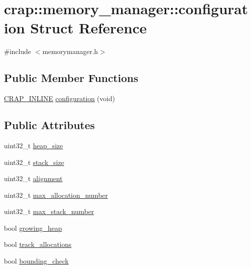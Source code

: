 \hypertarget{structcrap_1_1memory__manager_1_1configuration}{\section{crap\+:\+:memory\+\_\+manager\+:\+:configuration Struct Reference}
\label{structcrap_1_1memory__manager_1_1configuration}
}


{\ttfamily \#include $<$memorymanager.\+h$>$}

\subsection*{Public Member Functions}
\begin{DoxyCompactItemize}
\item 
\hyperlink{config__x86_8h_a5a40526b8d842e7ff731509998bb0f1c}{C\+R\+A\+P\+\_\+\+I\+N\+L\+I\+N\+E} \hyperlink{structcrap_1_1memory__manager_1_1configuration_a2fcb5bff5a3fbed1dc8a653fbbf1e035}{configuration} (void)
\end{DoxyCompactItemize}
\subsection*{Public Attributes}
\begin{DoxyCompactItemize}
\item 
uint32\+\_\+t \hyperlink{structcrap_1_1memory__manager_1_1configuration_aa7b7dd302d12394b4933cd10c19b9bb3}{heap\+\_\+size}
\item 
uint32\+\_\+t \hyperlink{structcrap_1_1memory__manager_1_1configuration_ab2398e2eef2484e19c711e4a5afade26}{stack\+\_\+size}
\item 
uint32\+\_\+t \hyperlink{structcrap_1_1memory__manager_1_1configuration_a4e2eb1caa57526730fc6aed395b9d13d}{alignment}
\item 
uint32\+\_\+t \hyperlink{structcrap_1_1memory__manager_1_1configuration_a793bafe39295d86d3dda7b2406678ee2}{max\+\_\+allocation\+\_\+number}
\item 
uint32\+\_\+t \hyperlink{structcrap_1_1memory__manager_1_1configuration_ae29f9aa318e67c99b5a8a008b9971fcd}{max\+\_\+stack\+\_\+number}
\item 
bool \hyperlink{structcrap_1_1memory__manager_1_1configuration_a942e759edcd1129f4571691e87172f8f}{growing\+\_\+heap}
\item 
bool \hyperlink{structcrap_1_1memory__manager_1_1configuration_a1e65aab18541fd1200bc32e344de79f7}{track\+\_\+allocations}
\item 
bool \hyperlink{structcrap_1_1memory__manager_1_1configuration_a08b165edae1810bab7f671cf90ee1c1a}{bounding\+\_\+check}
\end{DoxyCompactItemize}


